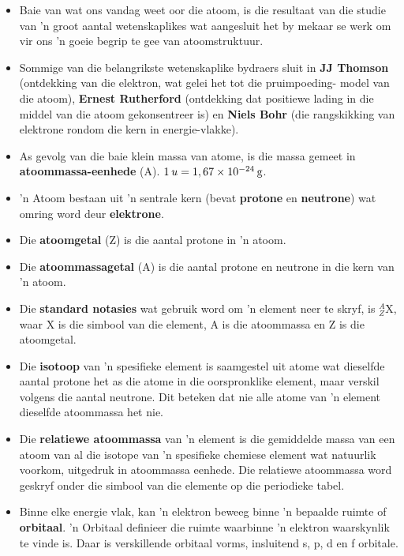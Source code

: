             \nopagebreak
      \begin{itemize}[noitemsep]
            \item Baie van wat ons vandag weet oor die atoom, is die resultaat van die studie van  'n groot aantal wetenskaplikes wat aangesluit het by mekaar se werk om vir ons  'n goeie begrip te gee van atoomstruktuur.
\item Sommige van die belangrikste wetenskaplike bydraers sluit in \textbf{JJ Thomson} (ontdekking van die elektron, wat gelei het tot die pruimpoeding- model van die atoom), \textbf{Ernest Rutherford} (ontdekking dat positiewe lading in die middel van die atoom gekonsentreer is) en \textbf{Niels Bohr} (die rangskikking van elektrone rondom die kern in energie-vlakke).
\item As gevolg van die baie klein massa van atome, is die massa gemeet in \textbf{atoommassa-eenhede} (A). $1\phantom{\rule{2pt}{0ex}}u=1,67\ensuremath{\times}10{}^{-24}\phantom{\rule{2pt}{0ex}}\text{g}$.
\item  'n Atoom bestaan uit  'n sentrale kern (bevat \textbf{protone} en \textbf{neutrone}) wat omring word deur \textbf{elektrone}.
\item Die \textbf{atoomgetal} (Z) is die aantal protone in  'n atoom.
\item Die \textbf{atoommassagetal} (A) is die aantal protone en neutrone in die kern van  'n atoom.
\item Die \textbf{standard notasies} wat gebruik word om  'n element neer te skryf, is $_{Z}^{A}\text{X}$, waar X is die simbool van die element, A is die atoommassa en Z is die atoomgetal.
\item Die \textbf{isotoop} van  'n spesifieke element is saamgestel uit atome wat dieselfde aantal protone het as die atome in die oorspronklike element, maar verskil volgens die aantal neutrone. Dit beteken dat nie alle atome van  'n element dieselfde atoommassa het nie.
\item Die \textbf{relatiewe atoommassa} van  'n element is die gemiddelde massa van een atoom van al die isotope van  'n spesifieke chemiese element wat natuurlik voorkom, uitgedruk in atoommassa eenhede. Die relatiewe atoommassa word geskryf onder die simbool van die elemente op die periodieke tabel.
\item Binne elke energie vlak, kan  'n elektron beweeg binne 'n bepaalde ruimte of \textbf{orbitaal}.  'n Orbitaal definieer die ruimte waarbinne  'n elektron waarskynlik te vinde is. Daar is verskillende orbitaal vorms, insluitend s, p, d en f orbitale.

\end{itemize}
